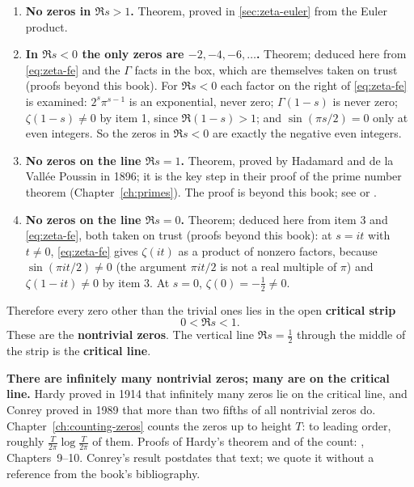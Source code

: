 \begin{enumerate}
\item \textbf{No zeros in $\Re s>1$.} Theorem, proved in \cref{sec:zeta-euler} from the Euler product.
\item \textbf{In $\Re s<0$ the only zeros are $-2,-4,-6,\dots$.} Theorem; deduced here from \cref{eq:zeta-fe} and the $\Gamma$ facts in the box, which are themselves taken on trust (proofs beyond this book). For $\Re s<0$ each factor on the right of \cref{eq:zeta-fe} is examined: $2^s\pi^{s-1}$ is an exponential, never zero; $\Gamma(1-s)$ is never zero; $\zeta(1-s)\ne0$ by item 1, since $\Re(1-s)>1$; and $\sin(\pi s/2)=0$ only at even integers. So the zeros in $\Re s<0$ are exactly the negative even integers.
\item \textbf{No zeros on the line $\Re s=1$.} Theorem, proved by Hadamard and de la Vall\'ee Poussin in 1896; it is the key step in their proof of the prime number theorem (Chapter~\ref{ch:primes}). The proof is beyond this book; see \cite{davenport} or \cite{titchmarsh}.
\item \textbf{No zeros on the line $\Re s=0$.} Theorem; deduced here from item 3 and \cref{eq:zeta-fe}, both taken on trust (proofs beyond this book): at $s=it$ with $t\ne0$, \cref{eq:zeta-fe} gives $\zeta(it)$ as a product of nonzero factors, because $\sin(\pi it/2)\ne0$ (the argument $\pi it/2$ is not a real multiple of $\pi$) and $\zeta(1-it)\ne0$ by item 3. At $s=0$, $\zeta(0)=-\tfrac12\ne0$.
\end{enumerate}

Therefore every zero other than the trivial ones lies in the open \textbf{critical strip}
\[
0<\Re s<1 .
\]
These are the \textbf{nontrivial zeros}. The vertical line $\Re s=\tfrac12$ through the middle of the strip is the \textbf{critical line}.

\begin{beyond}
\textbf{There are infinitely many nontrivial zeros; many are on the critical line.} Hardy proved in 1914 that infinitely many zeros lie on the critical line, and Conrey proved in 1989 that more than two fifths of all nontrivial zeros do. Chapter~\ref{ch:counting-zeros} counts the zeros up to height $T$: to leading order, roughly $\frac{T}{2\pi}\log\frac{T}{2\pi}$ of them. Proofs of Hardy's theorem and of the count: \cite{titchmarsh}, Chapters~9--10. Conrey's result postdates that text; we quote it without a reference from the book's bibliography.
\end{beyond}

